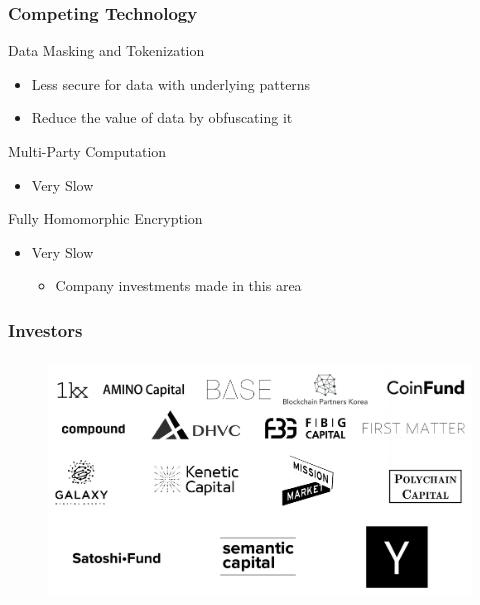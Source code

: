 \documentclass[xetex,mathsans,sans]{beamer}
\begin{document}
    \begin{frame}
      \frametitle{Competing Technology}
       Data Masking and Tokenization
       \begin{itemize}
           \item Less secure for data with underlying patterns
           \item Reduce the value of data by obfuscating it
       \end{itemize}
      
       Multi-Party Computation
       \begin{itemize}
           \item Very Slow
       \end{itemize}

       Fully Homomorphic Encryption
       \begin{itemize}
           \item Very Slow
           \begin{itemize}
               \item Company investments made in this area
           \end{itemize}
       \end{itemize}
     \end{frame}
    
    \begin{frame}
      \frametitle{Investors}
        \begin{figure}
            \centering
            \includegraphics[height=6.5cm]{pdf/investors.pdf}
        \end{figure}
    \end{frame}
\end{document}
